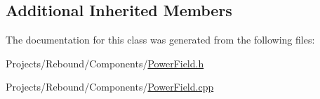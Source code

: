 \subsection*{Additional Inherited Members}


The documentation for this class was generated from the following files\-:\begin{DoxyCompactItemize}
\item 
Projects/\-Rebound/\-Components/\hyperlink{PowerField_8h}{Power\-Field.\-h}\item 
Projects/\-Rebound/\-Components/\hyperlink{PowerField_8cpp}{Power\-Field.\-cpp}\end{DoxyCompactItemize}
